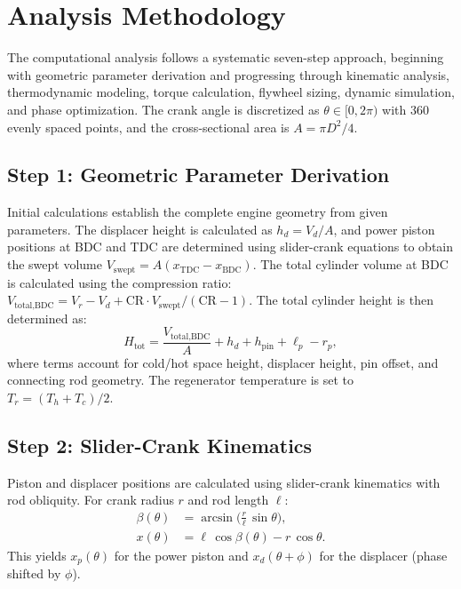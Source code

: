 \documentclass[12pt]{article}
\begin{document}
\section{Analysis Methodology}
The computational analysis follows a systematic seven-step approach, beginning with geometric parameter derivation and progressing through kinematic analysis, thermodynamic modeling, torque calculation, flywheel sizing, dynamic simulation, and phase optimization. The crank angle is discretized as \(\theta \in [0,2\pi)\) with 360 evenly spaced points, and the cross-sectional area is \(A = \pi D^{2}/4\).

\subsection{Step 1: Geometric Parameter Derivation}
Initial calculations establish the complete engine geometry from given parameters. The displacer height is calculated as \(h_d = V_d/A\), and power piston positions at BDC and TDC are determined using slider-crank equations to obtain the swept volume \(V_{\text{swept}} = A(x_{\text{TDC}} - x_{\text{BDC}})\). The total cylinder volume at BDC is calculated using the compression ratio: \(V_{\text{total,BDC}} = V_r - V_d + \mathrm{CR} \cdot V_{\text{swept}}/(\mathrm{CR}-1)\). The total cylinder height is then determined as:
\begin{equation}
  H_{\text{tot}} = \frac{V_{\text{total,BDC}}}{A} + h_d + h_{\text{pin}} + \ell_p - r_p,
\end{equation}
where terms account for cold/hot space height, displacer height, pin offset, and connecting rod geometry. The regenerator temperature is set to \(T_r = (T_h + T_c)/2\).

\subsection{Step 2: Slider-Crank Kinematics}
Piston and displacer positions are calculated using slider-crank kinematics with rod obliquity. For crank radius \(r\) and rod length \(\ell\):
\begin{align}
  \beta(\theta) &= \arcsin\!\biggl( \frac{r}{\ell}\,\sin\theta \biggr),\label{eq:beta-def}\\
  x(\theta) &= \ell\,\cos\beta(\theta) - r\,\cos\theta.
\end{align}
This yields \(x_{p}(\theta)\) for the power piston and \(x_{d}(\theta+\phi)\) for the displacer (phase shifted by \(\phi\)).
\end{document}
